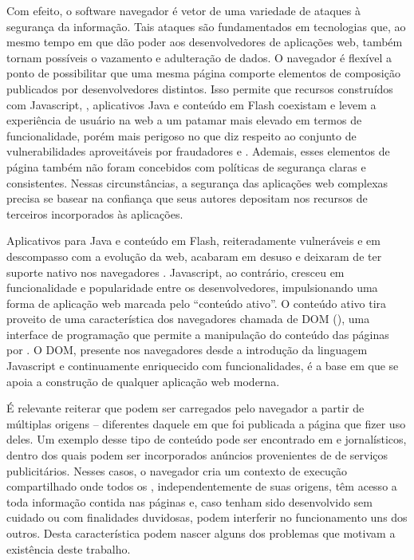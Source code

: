 Com efeito, o software navegador é vetor de uma variedade de ataques à segurança da informação. Tais ataques são fundamentados em tecnologias que, ao mesmo tempo em que dão poder aos desenvolvedores de aplicações web, também tornam possíveis o vazamento e adulteração de dados. O navegador é flexível a ponto de possibilitar que uma mesma página comporte elementos de composição publicados por desenvolvedores distintos. Isso permite que recursos construídos com Javascript, , aplicativos Java e conteúdo em Flash coexistam e levem a experiência de usuário na web a um patamar mais elevado em termos de funcionalidade, porém mais perigoso no que diz respeito ao conjunto de vulnerabilidades aproveitáveis por fraudadores e . Ademais, esses elementos de página também não foram concebidos com políticas de segurança claras e consistentes. Nessas circunstâncias, a segurança das aplicações web complexas precisa se basear na confiança que seus autores depositam nos recursos de terceiros incorporados às aplicações.

Aplicativos para Java e conteúdo em Flash, reiteradamente vulneráveis e em descompasso com a evolução da web, acabaram em desuso e deixaram de ter suporte nativo nos navegadores \cite{Verge2016, Adobe2017}. Javascript, ao contrário, cresceu em funcionalidade e popularidade entre os desenvolvedores, impulsionando uma forma de aplicação web marcada pelo ``conteúdo ativo''. O conteúdo ativo tira proveito de uma característica dos navegadores chamada de DOM (), uma interface de programação que permite a manipulação do conteúdo das páginas por {\scripts}. O DOM, presente nos navegadores desde a introdução da linguagem Javascript e continuamente enriquecido com funcionalidades, é a base em que se apoia a construção de qualquer aplicação web moderna.

É relevante reiterar que {\scripts} podem ser carregados pelo navegador a partir de múltiplas origens --  diferentes daquele em que foi publicada a página que fizer uso deles. Um exemplo desse tipo de conteúdo pode ser encontrado em  e  jornalísticos, dentro dos quais podem ser incorporados anúncios provenientes de  de serviços publicitários. Nesses casos, o navegador cria um contexto de execução compartilhado onde todos os {\scripts}, independentemente de suas origens, têm acesso a toda informação contida nas páginas e, caso tenham sido desenvolvido sem cuidado ou com finalidades duvidosas, podem interferir no funcionamento uns dos outros. Desta característica podem nascer alguns dos problemas que motivam a existência deste trabalho.

